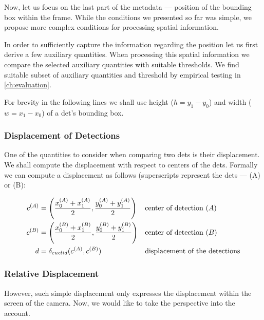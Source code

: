 \label{ssec:spatial_merging}

Now, let us focus on the last part of the metadata --- position of the bounding box within the frame. While the conditions we presented so far was simple, we propose more complex conditions for processing spatial information.

In order to sufficiently capture the information regarding the position let us first derive a few auxiliary quantities. When processing this spatial information we compare the selected auxiliary quantities with suitable thresholds. We find suitable subset of auxiliary quantities and threshold by empirical testing in \autoref{ch:evaluation}.

For brevity in the following lines we shall use height ($h = y_1 - y_0$) and
width ($w = x_1 - x_0$) of a \gls{det}'s bounding box.

\subsubsection{Displacement of Detections}

One of the quantities to consider when comparing two \glspl{det} is
their displacement. We shall compute the displacement with respect to centers
of the \glspl{det}. Formally we can compute a displacement as follows
(superscripts represent the \glspl{det} --- (A) or (B):

\begin{align*}
    c^{(A)} &= \left(\frac{x_0^{(A)} + x_1^{(A)}}{2}, \frac{y_0^{(A)} + y_1^{(A)}}{2}\right) &\vspace{1cm}&\text{center of detection }(A)\\
    c^{(B)} &= \left(\frac{x_0^{(B)} + x_1^{(B)}}{2}, \frac{y_0^{(B)} + y_1^{(B)}}{2}\right) &\vspace{1cm}&\text{center of detection }(B)\\
    d &= \delta_{euclid}(c^{(A)}, c^{(B)})&\vspace{1cm}&\text{displacement of the detections}
\end{align*}

\subsubsection{Relative Displacement}

However, such simple displacement only expresses the displacement within the screen of the camera. Now, we would like to take the perspective into the account.

